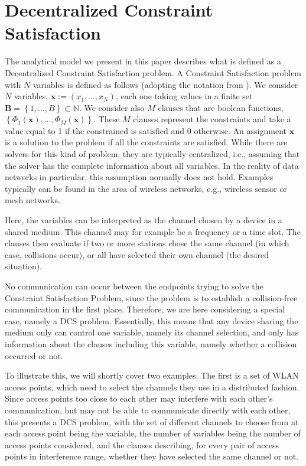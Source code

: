 \documentclass[journal]{IEEEtran}
\begin{document}
\section{Decentralized Constraint Satisfaction}
\label{sec:dcs}
The analytical model we present in this paper describes what is defined as a Decentralized Constraint Satisfaction problem. A Constraint Satisfaction problem with $N$ variables is defined as follows (adopting the notation from \cite{duffy2011dcs}).
We consider $N$ variables,  \mbox{$\mathbf{x} := (x_1,\dots,x_N)$}, each one taking values in a finite set $\mathbf{B}=\left\{1, \dots, B \right\} \subset \mathbb{N} $.
We consider also $M$ clauses that are boolean functions, $\left\{ \Phi_1(\mathbf{x}),\dots,\Phi_M(\mathbf{x}) \right\}$.
These $M$ clauses represent the constraints and take a value equal to 1 if the constrained is satisfied and 0 otherwise.
An assignment $\mathbf{x}$ is a solution to the problem if all the constraints are satisfied.
While there are solvers for this kind of problem, they are typically centralized, i.e., assuming that the solver has the complete information about all variables. 
In the reality of data networks in particular, this assumption normally does not hold. Examples typically can be found in the area of wireless networks, e.g., wireless sensor or mesh networks. 

Here, the variables can be interpreted as the channel chosen by a device in a shared medium. This channel may for example be a frequency or a time slot. The clauses then evaluate if two or more stations chose the same channel (in which case, collisions occur), or all have selected their own channel (the desired situation). 

No communication can occur between the endpoints trying to solve the Constraint Satisfaction Problem, since the problem is to establish a collision-free communication in the first place. Therefore, we are here considering a special case, namely a DCS problem. Essentially, this means that any device sharing the medium only can control one variable, namely its channel selection, and only has information about the clauses including this variable, namely whether a collision occurred or not.

To illustrate this, we will shortly cover two examples. The first is a set of WLAN access points, which need to select the channels they use in a distributed fashion. Since access points too close to each other may interfere with each other's communication, but may not be able to communicate directly with each other, this presents a DCS problem, with the set of different channels to choose from at each access point being the variable, the number of variables being the number of access points considered, and the clauses describing, for every pair of access points in interference range, whether they have selected the same channel or not.
\end{document}
